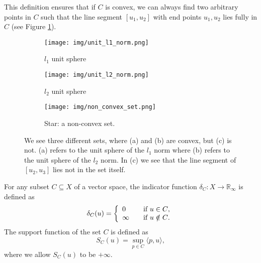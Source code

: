     This definition ensures that if $C$ is convex, we can always find two arbitrary points in $C$ such that the line segment $[u_{1}, u_{2}]$ with end points $u_{1}, u_{2}$ lies fully in $C$ (see Figure \ref{fig:convex_and_non_convex_sets}).
    \begin{figure}[ht]
        \centering
        \begin{subfigure}[b]{0.3\textwidth}
            \texttt{[image: img/unit\_l1\_norm.png]}
            \caption{$l_{1}$ unit sphere}
        \end{subfigure}
        \begin{subfigure}[b]{0.3\textwidth}
            \texttt{[image: img/unit\_l2\_norm.png]}
            \caption{$l_{2}$ unit sphere}
        \end{subfigure}
        \begin{subfigure}[b]{0.3\textwidth}
            \texttt{[image: img/non\_convex\_set.png]}
            \caption{Star: a non-convex set.}
        \end{subfigure}
        \caption{We see three different sets, where (a) and (b) are convex, but (c) is not. (a) refers to the unit sphere of the $l_{1}$ norm where (b) refers to the unit sphere of the $l_{2}$ norm. In (c) we see that the line segment of $[u_{2}, u_{3}]$ lies not in the set itself.}
        \label{fig:convex_and_non_convex_sets}
    \end{figure}

    \begin{definition} %
    \label{def:indicator_function}

        For any subset $C \subseteq X$ of a vector space, the indicator function $\delta_{C}: X \longrightarrow \mathbb{R}_{\infty}$ is defined as
            \begin{equation}
                \delta_{C}(u) =
                \left\{
                    \begin{array}{l l}
                      0      & \quad \text{if $u \in C$}, \\
                      \infty & \quad \text{if $u \notin C$}.
                    \end{array}
                \right.
            \label{eq:indicator_function}
            \end{equation}
        The support function of the set $C$ is defined as
            \begin{equation}
                S_{C}(u) = \sup_{p \in C} \langle p, u \rangle,
            \label{eq:support_function}
            \end{equation}
        where we allow $S_{C}(u)$ to be $+\infty$.

    \end{definition}

